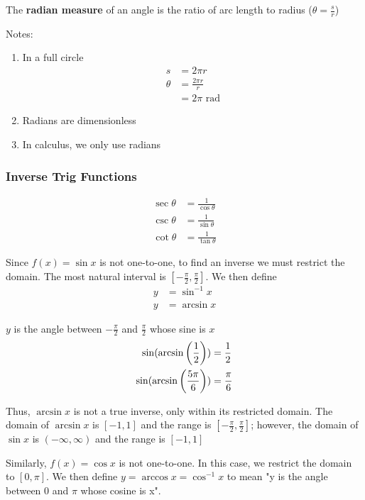 \documentclass[12pt]{article}
\begin{document}
The {\bf radian measure} of an angle is the ratio of arc length to radius ($\theta = \frac{s}{r}$)

Notes:
\begin{enumerate}
\item In a full circle \begin{align*}
                         s &= 2\pi r\\
                         \theta &= \frac{2\pi r}{r}\\
                         &= 2\pi \text{ rad}
                       \end{align*}
\item Radians are dimensionless
\item In calculus, we only use radians
\end{enumerate}

\subsubsection*{Inverse Trig Functions}
\begin{align*}
\sec\theta &= \frac{1}{\cos\theta}\\
\csc\theta &= \frac{1}{\sin\theta}\\
\cot\theta &= \frac{1}{\tan\theta}
\end{align*}

Since $f(x)=\sin x$ is not one-to-one, to find an inverse we must restrict the domain. The most natural interval is $[-\frac{\pi}{2},\frac{\pi}{2}]$. We then define
\begin{align*}
y &= \sin^{-1}x\\
y &= \arcsin x
\end{align*}

$y$ is the angle between $-\frac{\pi}{2}$ and $\frac{\pi}{2}$ whose sine is $x$
\begin{align*}
\sin(\arcsin\bigg(\frac{1}{2} \bigg)) &= \frac{1}{2} \\
\sin(\arcsin\bigg(\frac{5\pi}{6}\bigg)) &= \frac{\pi}{6}
\end{align*}

Thus, $\arcsin x$ is not a true inverse, only within its restricted domain. The domain of $\arcsin x$ is $[-1,1]$ and the range is $[-\frac{\pi}{2},\frac{\pi}{2}]$; however, the domain of $\sin x$ is $(-\infty,\infty)$ and the range is $[-1,1]$

Similarly, $f(x) = \cos x$ is not one-to-one. In this case, we restrict the domain to $[0,\pi]$. We then define $y=\arccos x=\cos^{-1}x$ to mean "y is the angle between 0 and $\pi$ whose cosine is x".
\end{document}
